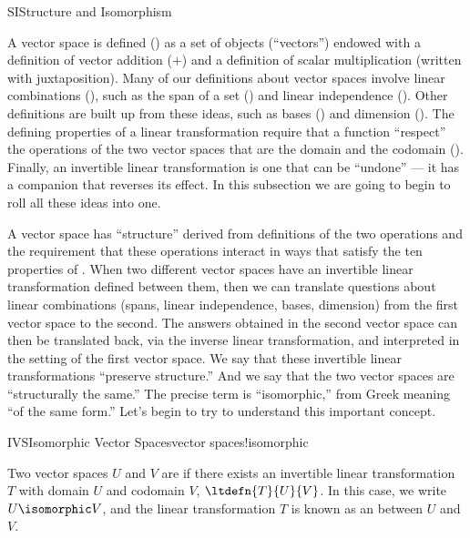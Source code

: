 \begin{subsect}{SI}{Structure and Isomorphism}
%
\begin{para}A vector space is defined () as a set of objects (``vectors'') endowed with a definition of vector addition ($+$) and a definition of scalar multiplication (written with juxtaposition).  Many of our definitions about vector spaces involve linear combinations (), such as the span of a set () and linear independence ().  Other definitions are built up from these ideas, such as bases () and dimension ().  The defining properties of a linear transformation require that a function ``respect'' the operations of the two vector spaces that are the domain and the codomain ().  Finally, an invertible linear transformation is one that can be ``undone'' --- it has a companion that reverses its effect.  In this subsection we are going to begin to roll all these ideas into one.\end{para}
%
\begin{para}A vector space has ``structure'' derived from definitions of the two operations and the requirement that these operations interact in ways that satisfy the ten properties of .  When two different vector spaces have an invertible linear transformation defined between them, then we can translate questions about linear combinations (spans, linear independence, bases, dimension) from the first vector space to the second.  The answers obtained in the second vector space can then be translated back, via the inverse linear transformation, and interpreted in the setting of the first vector space.  We say that these invertible linear transformations ``preserve structure.''  And we say that the two vector spaces are ``structurally the same.''  The precise term is ``isomorphic,'' from Greek meaning ``of the same form.''  Let's begin to try to understand this important concept.\end{para}
%
\begin{definition}{IVS}{Isomorphic Vector Spaces}{vector spaces!isomorphic}
\begin{para}Two vector spaces $U$ and $V$ are  if there exists an invertible linear transformation $T$ with domain $U$ and codomain $V$, $\ltdefn{T}{U}{V}$.  In this case, we write $U\isomorphic V$, and the linear transformation $T$ is known as an  between $U$ and $V$.\end{para}

\end{definition}
\end{subsect}
